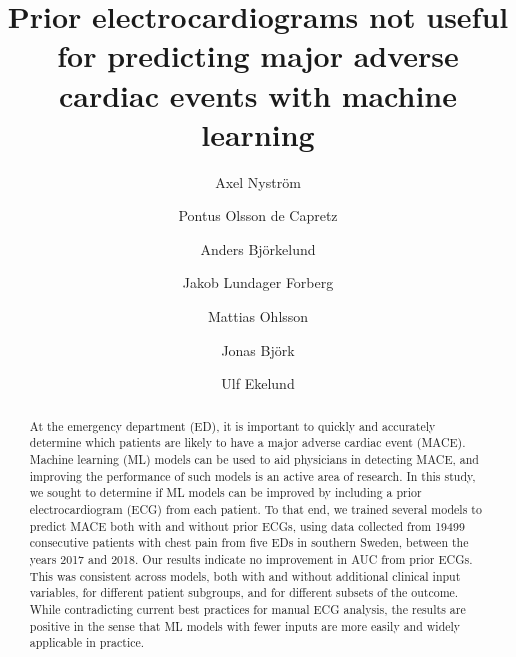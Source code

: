 \documentclass[preprint]{elsarticle}
\begin{document}
\begin{frontmatter}

\title{Prior electrocardiograms not useful for predicting major adverse cardiac events with machine learning}


\author[inst1]{Axel Nystr\"{o}m}
\author[inst2,inst3]{Pontus Olsson de Capretz}
\author[inst4]{Anders Bj\"{o}rkelund}
\author[inst3,inst5]{Jakob Lundager Forberg}
\author[inst4,inst6]{Mattias Ohlsson}
\author[inst1,inst7]{Jonas Bj\"{o}rk}
\author[inst2,inst3]{Ulf Ekelund}


            






\begin{abstract}
At the emergency department (ED), it is important to quickly and accurately determine which patients are likely to have a major adverse cardiac event (MACE). Machine learning (ML) models can be used to aid physicians in detecting MACE, and improving the performance of such models is an active area of research. In this study, we sought to determine if ML models can be improved by including a prior electrocardiogram (ECG) from each patient. To that end, we trained several models to predict MACE both with and without prior ECGs, using data collected from 19499 consecutive patients with chest pain from five EDs in southern Sweden, between the years 2017 and 2018. Our results indicate no improvement in AUC from prior ECGs. This was consistent across models, both with and without additional clinical input variables, for different patient subgroups, and for different subsets of the outcome. While contradicting current best practices for manual ECG analysis, the results are positive in the sense that ML models with fewer inputs are more easily and widely applicable in practice.
\end{abstract}


\end{frontmatter}
\end{document}
